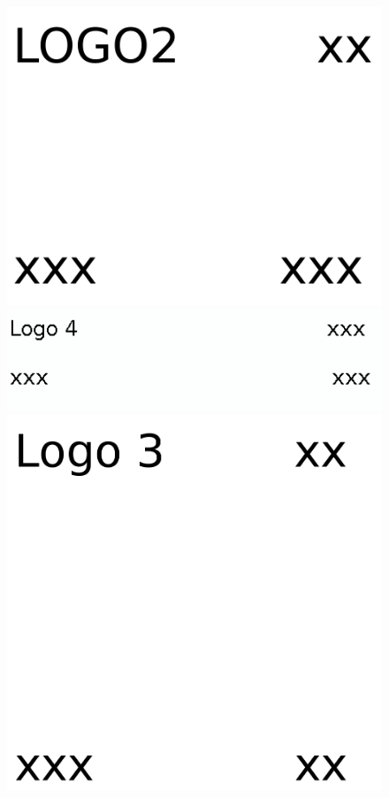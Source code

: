 \begin{figure}[H]
 \centering
 \includegraphics[scale=0.055]{logos/logo2.png}
 \includegraphics[scale=0.45]{logos/logo4.png}
 \includegraphics[scale=0.08]{logos/logo3.png}
 \end{figure}






